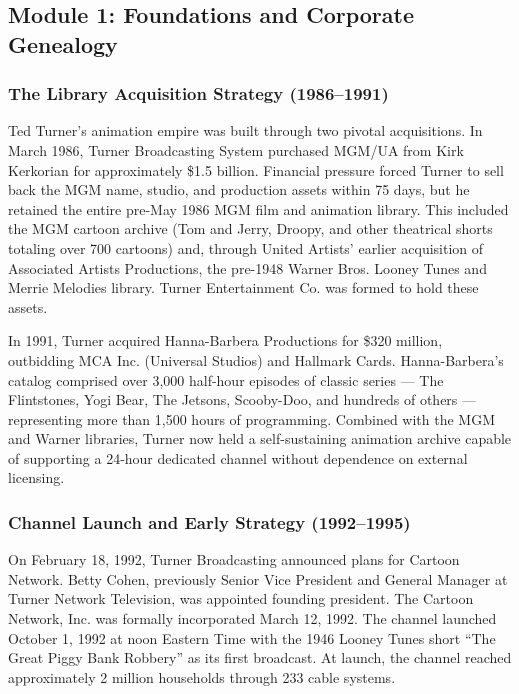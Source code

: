\documentclass[11pt,letterpaper]{article}
\begin{document}
\subsection{Module 1: Foundations and Corporate Genealogy}

\subsubsection{The Library Acquisition Strategy (1986--1991)}

Ted Turner's animation empire was built through two pivotal acquisitions. In March 1986, Turner Broadcasting System purchased MGM/UA from Kirk Kerkorian for approximately \$1.5 billion. Financial pressure forced Turner to sell back the MGM name, studio, and production assets within 75 days, but he retained the entire pre-May 1986 MGM film and animation library. This included the MGM cartoon archive (Tom and Jerry, Droopy, and other theatrical shorts totaling over 700 cartoons) and, through United Artists' earlier acquisition of Associated Artists Productions, the pre-1948 Warner Bros. Looney Tunes and Merrie Melodies library. Turner Entertainment Co. was formed to hold these assets.

In 1991, Turner acquired Hanna-Barbera Productions for \$320 million, outbidding MCA Inc. (Universal Studios) and Hallmark Cards. Hanna-Barbera's catalog comprised over 3,000 half-hour episodes of classic series --- The Flintstones, Yogi Bear, The Jetsons, Scooby-Doo, and hundreds of others --- representing more than 1,500 hours of programming. Combined with the MGM and Warner libraries, Turner now held a self-sustaining animation archive capable of supporting a 24-hour dedicated channel without dependence on external licensing.

\subsubsection{Channel Launch and Early Strategy (1992--1995)}

On February 18, 1992, Turner Broadcasting announced plans for Cartoon Network. Betty Cohen, previously Senior Vice President and General Manager at Turner Network Television, was appointed founding president. The Cartoon Network, Inc. was formally incorporated March 12, 1992. The channel launched October 1, 1992 at noon Eastern Time with the 1946 Looney Tunes short ``The Great Piggy Bank Robbery'' as its first broadcast. At launch, the channel reached approximately 2 million households through 233 cable systems.
\end{document}
